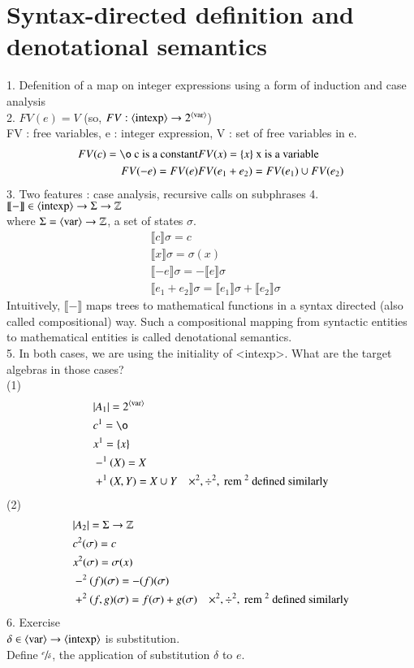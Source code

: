 \documentclass{article}[12pt]
\begin{document}
\section{Syntax-directed definition and denotational semantics}
1. Defenition of a map on integer expressions using a form of induction and case analysis \\
2. $FV(e) = V$ (so, $FV:\langle \text{intexp}\rangle \rightarrow 2^{\langle \text{var}\rangle}$) \\
FV : free variables, e : integer expression, V : set of free variables in e. \\
\begin{align*}
    FV(c) = \o \text{ c is a constant}& FV(x) = \{x\} \text{ x is a variable}\\
    FV(-e) = FV(e) & FV(e_1 + e_2) = FV(e_1) \cup FV(e_2)
\end{align*}
3. Two features : case analysis, recursive calls on subphrases
4. $\llbracket - \rrbracket \in \langle \text{intexp}\rangle \rightarrow \Sigma \rightarrow \mathbb{Z}$ \\
where $\Sigma = \langle \text{var}\rangle \rightarrow \mathbb{Z}$, a set of states $\sigma$. \\
\begin{align*}
    &\llbracket c \rrbracket \sigma = c \\
    &\llbracket x \rrbracket \sigma = \sigma(x) \\
    &\llbracket -e \rrbracket \sigma = - \llbracket e \rrbracket \sigma \\
    &\llbracket e_1 + e_2 \rrbracket \sigma = \llbracket e_1 \rrbracket \sigma + \llbracket e_2 \rrbracket \sigma
\end{align*}
Intuitively, $\llbracket - \rrbracket$ maps trees to mathematical functions in a syntax directed (also called compositional) way. Such a compositional mapping from syntactic entities to mathematical entities is called denotational semantics. \\
5. In both cases, we are using the initiality of <intexp>. What are the target algebras in those cases? \\
(1) \begin{align*}
    &|A_1| = 2^{\nonterminal{var}} \\
    &c^1 = \o \\
    &x^1 = \{x\}\\
    &-^1 (X) = X \\
    &+^1 (X, Y) = X\cup Y & \times^2, \div^2, \rem^2 \text{ defined similarly}
\end{align*}
(2)
\begin{align*}
    &|A_2| = \Sigma \rightarrow \mathbb{Z} \\
    &c^2 (\sigma) = c\\
    &x^2 (\sigma) = \sigma(x) \\
    &-^2 (f)(\sigma) = -(f)(\sigma) \\
    &+^2 (f, g)(\sigma) = f(\sigma) + g(\sigma) & \times^2, \div^2, \text{ rem }^2 \text{ defined similarly}
\end{align*}
6. Exercise \\
$\delta \in \langle \text{var}\rangle \rightarrow \langle \text{intexp}\rangle$ is substitution. \\
Define $\sfrac{e}{\delta}$, the application of substitution $\delta$ to $e$.
\end{document}
